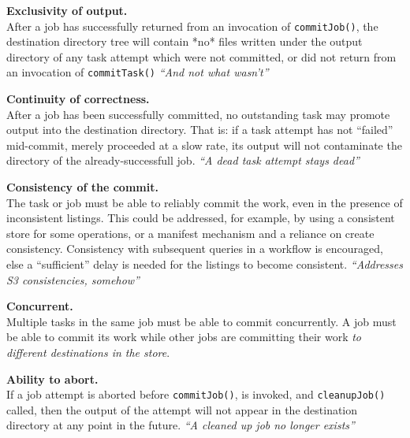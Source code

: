 \documentclass[conference]{IEEEtran}
\begin{document}
\begin{paragraph}
  \textbf{Exclusivity of output.}\\
  After a job has successfully returned from an invocation of \texttt{commitJob()},
  the destination directory tree will contain *no* files written under the output directory
  of any task attempt which were not committed, or did not return from an invocation of \texttt{commitTask()}
  \emph{``And not what wasn't''}
\end{paragraph}

\begin{paragraph}
  \textbf{Continuity of correctness.}\\
  After a job has been successfully committed, no outstanding task may promote
  output into the destination directory.
  That is: if a task attempt has not ``failed'' mid-commit, merely proceeded at a slow rate,
  its output will not contaminate the directory of the already-successfull job.
  \emph{``A dead task attempt stays dead''}
\end{paragraph}

\begin{paragraph}
  \textbf{Consistency of the commit.}\\
  The task or job must be able to reliably commit the work, even in the presence
  of inconsistent listings.
  This could be addressed, for example, by using a consistent store for some operations,
  or a manifest mechanism and a reliance on create consistency.
  Consistency with subsequent queries in a workflow is encouraged, else a ``sufficient''
  delay is needed for the listings to become consistent.
  \emph{``Addresses S3 consistencies, somehow''}
\end{paragraph}


\begin{paragraph}
  \textbf{Concurrent.}\\
  Multiple tasks in the same job must be able to commit concurrently.
  A job must be able to commit its work while other jobs are committing
  their work \emph{to different destinations in the store}.
\end{paragraph}


\begin{paragraph}
  \textbf{Ability to abort.}\\
  If a job attempt is aborted before \texttt{commitJob()}, is invoked, and
  \texttt{cleanupJob()} called, then the output of the attempt will not appear in the
  destination directory at any point in the future.
  \emph{``A cleaned up job no longer exists''}
\end{paragraph}
\end{document}
